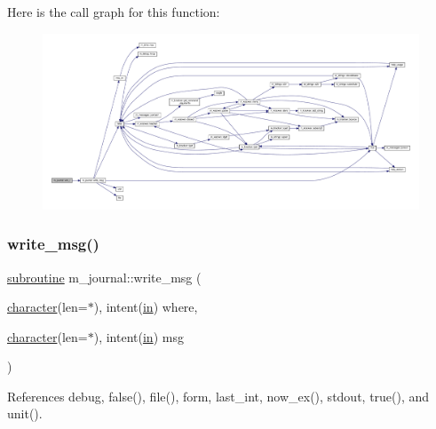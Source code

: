 Here is the call graph for this function\+:
\nopagebreak
\begin{figure}[H]
\begin{center}
\leavevmode
\includegraphics[width=350pt]{namespacem__journal_ad22893c3621042df7d66b9f3864aa457_cgraph}
\end{center}
\end{figure}
\mbox{\label{namespacem__journal_a98698c251ec1883612ae40c5f2443fd9}} 
\subsubsection{\texorpdfstring{write\+\_\+msg()}{write\_msg()}}
{\footnotesize\ttfamily \hyperlink{M__stopwatch_83_8txt_acfbcff50169d691ff02d4a123ed70482}{subroutine} m\+\_\+journal\+::write\+\_\+msg (\begin{DoxyParamCaption}\item[{\hyperlink{option__stopwatch_83_8txt_abd4b21fbbd175834027b5224bfe97e66}{character}(len=$\ast$), intent(\hyperlink{M__journal_83_8txt_afce72651d1eed785a2132bee863b2f38}{in})}]{where,  }\item[{\hyperlink{option__stopwatch_83_8txt_abd4b21fbbd175834027b5224bfe97e66}{character}(len=$\ast$), intent(\hyperlink{M__journal_83_8txt_afce72651d1eed785a2132bee863b2f38}{in})}]{msg }\end{DoxyParamCaption})\hspace{0.3cm}{\ttfamily [private]}}



References debug, false(), file(), form, last\+\_\+int, now\+\_\+ex(), stdout, true(), and unit().

